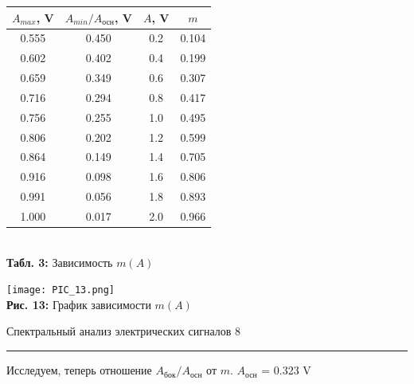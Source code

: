 \documentclass[12pt,a4paper]{scrartcl}
\begin{document}
	\begin{center}
		\begin{tabular}{|c|c|c|c|}
			\hline
			$A_{max}$, V & $A_{min} / A_{\text{осн}}$, V & $A$, V & $m$
			\\\hline
			0.555 & 0.450 & 0.2 & 0.104
			\\\hline
			0.602 & 0.402 & 0.4 & 0.199
			\\\hline
			0.659 & 0.349 & 0.6 & 0.307
			\\\hline
			0.716 & 0.294 & 0.8 & 0.417
			\\\hline
			0.756 & 0.255 & 1.0 & 0.495
			\\\hline
			0.806 & 0.202 & 1.2 & 0.599
			\\\hline
			0.864 & 0.149 & 1.4 & 0.705
			\\\hline
			0.916 & 0.098 & 1.6 & 0.806
			\\\hline
			0.991 & 0.056 & 1.8 & 0.893
			\\\hline
			1.000 & 0.017 & 2.0 & 0.966
			\\\hline
		\end{tabular}
		\\\textbf{Табл. 3:} Зависимость $m(A)$
	\end{center}

	\begin{center}
		\texttt{[image: PIC\_13.png]}
		\\\textbf{Рис. 13:} График зависимости $m(A)$
	\end{center}
	
	
	\newpage
	
	
	\begin{flushleft}
		\footnotesize{Спектральный анализ электрических сигналов} \hspace{\fill} \footnotesize{8}
		\\[-0.3cm]\noindent\rule{\textwidth}{0.3pt}
	\end{flushleft}
	
	Исследуем, теперь отношение $A_{\text{бок}} / A_{\text{осн}}$ от $m$. $A_{\text{осн}}$ = 0.323 V
	
\end{document}
